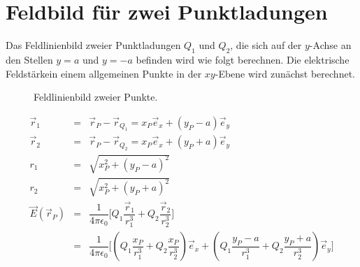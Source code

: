 \section{Feldbild für zwei Punktladungen}
Das Feldlinienbild zweier Punktladungen $Q_1$ und $Q_2$, die sich auf der $y$-Achse an den Stellen $y=a$ und $y=-a$ befinden wird wie folgt berechnen. Die elektrische Feldstärkein einem allgemeinen Punkte in der $xy$-Ebene wird zunächst berechnet. 
\begin{figure}[H]
\centering
{}
\caption{Feldlinienbild zweier Punkte.}
\label{fig_Ik}
\end{figure}
\begin{equation}
\boxed{
\begin{array}{lll}
\overrightarrow{r}_1&=&\overrightarrow{r}_P-\overrightarrow{r}_{Q_1}=x_P\overrightarrow{e}_x+\left(y_P-a\right)\overrightarrow{e}_y\\
\overrightarrow{r}_2&=&\overrightarrow{r}_P-\overrightarrow{r}_{Q_2}=x_P\overrightarrow{e}_x+\left(y_P+a\right)\overrightarrow{e}_y\\
r_1&=&\sqrt{x_P^2+\left(y_P-a\right)^2}\\
r_2&=&\sqrt{x_P^2+\left(y_P+a\right)^2}\\
\overrightarrow{E}\left(\overrightarrow{r}_P\right)&=&\dfrac{1}{4\pi\epsilon_0}\Bigg[Q_1\dfrac{\overrightarrow{r}_1}{r_1^3}+Q_2\dfrac{\overrightarrow{r}_2}{r_2^3}\Bigg]\\
&=&\dfrac{1}{4\pi\epsilon_0}\Bigg[\left(Q_1\dfrac{x_P}{r_1^3}+Q_2\dfrac{x_P}{r_2^3}\right)\overrightarrow{e}_x+\left(Q_1\dfrac{y_P-a}{r_1^3}+Q_2\dfrac{y_P+a}{r_2^3}\right)\overrightarrow{e}_y\Bigg]\\
\end{array}
}
\end{equation}
